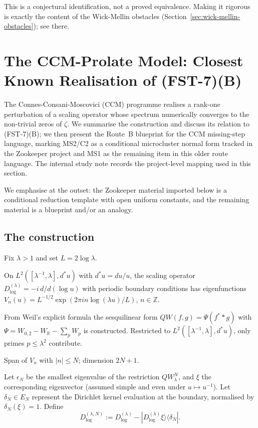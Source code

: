\documentclass[11pt,a4paper]{article}
\theoremstyle{plain}
\theoremstyle{definition}
\newcommand{\R}{\mathbb{R}}
\newcommand{\Z}{\mathbb{Z}}
\begin{document}
This is a conjectural identification, not a proved equivalence.
Making it rigorous is exactly the content of the Wick-Mellin
obstacles (Section~\ref{sec:wick-mellin-obstacles}); see there.

\section{The CCM-Prolate Model: Closest Known Realisation of (FST-7)(B)}
\label{sec:ccm-prolate}

The Connes-Consani-Moscovici (CCM) programme
\cite{ConnesConsani2023,ConnesMoscovici2022,ConnesConsaniMoscovici2025}
realises a rank-one perturbation of a scaling operator whose spectrum
numerically converges to the non-trivial zeros of $\zeta$.  We
summarise the construction and discuss its relation to (FST-7)(B);
we then present the Route~B blueprint for the CCM missing-step
language, marking MS2/C2 as a conditional microcluster normal form
tracked in the Zookeeper project and MS1 as the remaining item in
this older route language.  The internal study note \cite{CCMStudy}
records the project-level mapping used in this section.

We emphasise at the outset: the Zookeeper material imported below is
a conditional reduction template with open uniform constants, and the
remaining material is a blueprint and/or an analogy.

\subsection{The construction}
\label{sec:ccm-construction}

Fix $\lambda > 1$ and set $L = 2 \log\lambda$.

\begin{description}[leftmargin=*,style=nextline]
\item[\textbf{Scaling triple.}] On $L^2([\lambda^{-1}, \lambda],
  d^\ast u)$ with $d^\ast u = du/u$, the scaling operator
  $D^{(\lambda)}_{\log} = -i\,d/d(\log u)$ with periodic boundary
  conditions has eigenfunctions $V_n(u) = L^{-1/2}\exp(2\pi i n
  \log(\lambda u)/L)$, $n \in \Z$.
\item[\textbf{Weil quadratic form.}] From Weil's explicit formula
  the sesquilinear form $QW(f,g) = \Psi(f^\ast * g)$ with $\Psi =
  W_{0,2} - W_\R - \sum_p W_p$ is constructed.  Restricted to
  $L^2([\lambda^{-1}, \lambda], d^\ast u)$, only primes $p \leq
  \lambda^2$ contribute.
\item[\textbf{Test subspace $E_N$.}] Span of $V_n$ with $|n|
  \leq N$; dimension $2N+1$.
\item[\textbf{Rank-one perturbation.}] Let $\epsilon_N$ be the
  smallest eigenvalue of the restriction $QW_\lambda^N$, and $\xi$
  the corresponding eigenvector (assumed simple and even under $u
  \mapsto u^{-1}$).  Let $\delta_N \in E_N$ represent the Dirichlet
  kernel evaluation at the boundary, normalised by $\delta_N(\xi) =
  1$.  Define
  \[
     D^{(\lambda,N)}_{\log} := D^{(\lambda)}_{\log}
       - |D^{(\lambda)}_{\log}\xi\rangle\langle\delta_N|.
  \]
\end{description}
\end{document}
